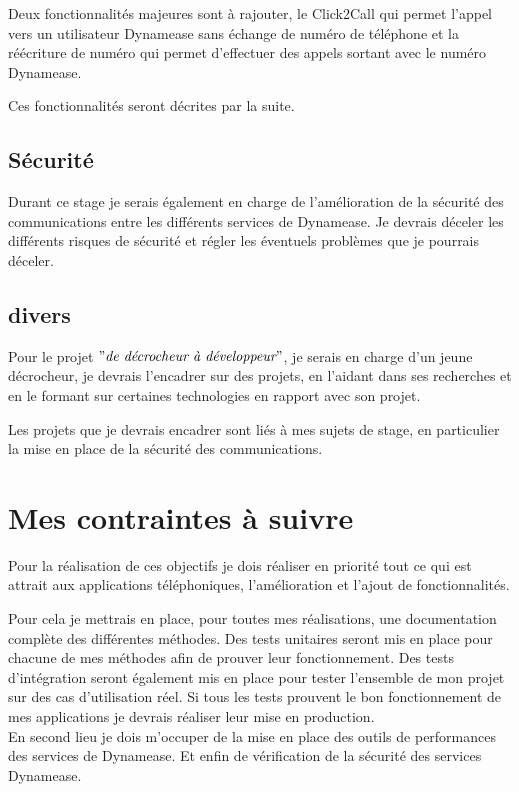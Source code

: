 Deux fonctionnalités majeures sont à rajouter, le Click2Call qui permet l'appel vers un utilisateur Dynamease sans échange de numéro de téléphone et la réécriture de numéro qui permet d'effectuer des appels sortant avec le  numéro Dynamease.

Ces fonctionnalités seront décrites par la suite.

\subsection{Sécurité}

Durant ce stage je serais également en charge de l'amélioration de la sécurité des communications entre les différents services de Dynamease. Je devrais déceler les différents risques de sécurité et régler les éventuels problèmes que je pourrais déceler.

\subsection{divers}

Pour le projet $"\textit{de décrocheur à développeur}"$, je serais en charge d'un jeune décrocheur, je devrais l'encadrer sur des projets, en l'aidant dans ses recherches et en le formant sur certaines technologies en rapport avec son projet.

Les projets que je devrais encadrer sont liés à mes sujets de stage, en particulier la mise en place de la sécurité des communications.

\section{Mes contraintes à suivre}

Pour la réalisation de ces objectifs je dois réaliser en priorité tout ce qui est attrait aux applications téléphoniques, l'amélioration et l'ajout de fonctionnalités.

Pour cela je mettrais en place, pour toutes mes réalisations, une documentation complète des différentes méthodes. Des tests unitaires seront mis en place pour chacune de mes méthodes afin de prouver leur fonctionnement. Des tests d'intégration seront également mis en place pour tester l'ensemble de mon projet sur des cas d'utilisation réel. Si tous les tests prouvent le bon fonctionnement de mes applications je devrais réaliser leur mise en production.\\

En second lieu je dois m'occuper de la mise en place des outils de performances des services de Dynamease. Et enfin de vérification de la sécurité des services Dynamease.